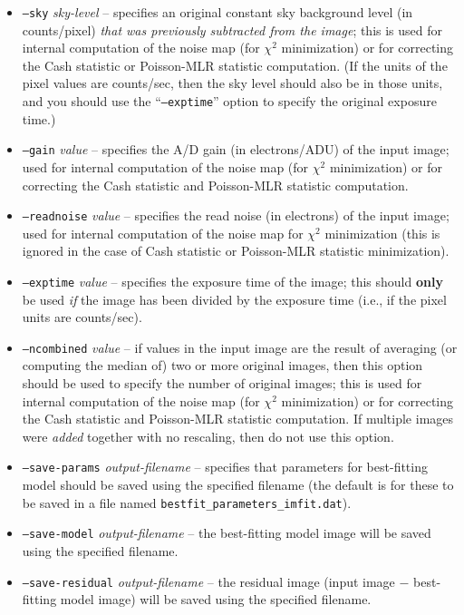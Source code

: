 \documentclass[10pt,a4paper,article]{memoir}
\newcommand{\chisquare}{\ensuremath{\chi^{2}}}
\begin{document}
\begin{itemize}
\bigskip

\item \texttt{--sky} \textit{sky-level} -- specifies an original
constant sky background level (in counts/pixel) \textit{that was
previously subtracted from the image}; this is used for internal
computation of the noise map (for \chisquare{} minimization) or for
correcting the Cash statistic or Poisson-MLR statistic computation. (If
the units of the pixel values are counts/sec, then the sky level should
also be in those units, and you should use the ``\texttt{--exptime}''
option to specify the original exposure time.)

\item \texttt{--gain} \textit{value} -- specifies the A/D gain (in electrons/ADU)
of the input image; used for internal computation of the noise map (for \chisquare{}
minimization) or for correcting the Cash statistic and Poisson-MLR statistic computation.

\item \texttt{--readnoise} \textit{value} -- specifies the read noise (in electrons)
of the input image; used for internal computation of the noise map for \chisquare{}
minimization (this is ignored in the case of Cash statistic or Poisson-MLR statistic minimization).

\item \texttt{--exptime} \textit{value} -- specifies the exposure time of the image;
this should \textbf{only} be used \textit{if} the image has been divided by the exposure time
(i.e., if the pixel units are counts/sec).

\item \texttt{--ncombined} \textit{value} -- if values in the input
image are the result of averaging (or computing the median of) two or
more original images, then this option should be used to specify the
number of original images; this is used for internal computation of the noise map (for \chisquare{}
minimization) or for correcting the Cash statistic and Poisson-MLR statistic computation.  
If multiple images were \textit{added} together with no rescaling, then do not use this option.

\bigskip

\item \texttt{--save-params} \textit{output-filename} -- specifies that parameters 
for best-fitting model should be saved using the specified filename (the default is
for these to be saved in a file named \texttt{bestfit\_parameters\_imfit.dat}).
\item \texttt{--save-model} \textit{output-filename} -- the best-fitting model image
will be saved using the specified filename.
\item \texttt{--save-residual} \textit{output-filename} -- the residual image (input
image $-$ best-fitting model image) will be saved using the specified filename.


\end{itemize}
\end{document}
